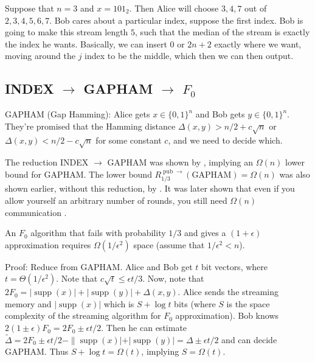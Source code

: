 \documentclass[11pt]{article}
\newcommand{\on}{\operatorname}
\begin{document}
\smallskip

Suppose that $n = 3$ and $x = 101_2$. Then Alice will choose $3, 4, 7$ out of $2, 3, 4, 5, 6, 7$. Bob cares about a particular index, suppose the first index. Bob is going to make this stream length $5$, such that the median of the stream is exactly the index he wants. Basically, we can insert 0 or $2n + 2$ exactly where we want, moving around the $j$ index to be the middle, which then we can then output.

\subsection{INDEX $\to$ GAPHAM $\to$ $F_0$}

GAPHAM (Gap Hamming): Alice gets $x \in \{0, 1\}^n$ and Bob gets $y \in \{0, 1\}^n$. They're promised that the Hamming distance $\Delta(x, y) > n/2 + c\sqrt{n}$ or $\Delta(x, y) < n/2 - c\sqrt{n}$ for some constant $c$, and we need to decide which.

\smallskip

The reduction INDEX $\to$ GAPHAM was shown by \cite{jayram2008one}, implying an $\Omega(n)$ lower bound for GAPHAM. The lower bound $R^{\on{pub}\rightarrow}_{1/3}(\mathrm{GAPHAM}) = \Omega(n)$ was also shown earlier, without this reduction, by \cite{IndykW03,Woodruff04}. It was later shown that even if you allow yourself an arbitrary number of rounds, you still need $\Omega(n)$ communication \cite{ChakrabartiR12}. 

\smallskip

An $F_0$ algorithm that fails with probability $1/3$ and gives a $(1 + \epsilon)$ approximation requires $\Omega(1/\epsilon^2)$ space (assume that $1/\epsilon^2 < n$).

Proof: Reduce from GAPHAM. Alice and Bob get $t$ bit vectors, where $t = \Theta(1/\epsilon^2)$. Note that $c\sqrt{t}\le \epsilon t/3$. Now, note that $2F_0 = |\on{supp}(x)| + |\on{supp}(y)| + \Delta(x, y)$. Alice sends the streaming memory and $|\on{supp}(x)|$ which is $S + \log t$ bits (where $S$ is the space complexity of the streaming algorithm for $F_0$ approximation). Bob knows $2(1 \pm \epsilon)F_0 = 2F_0 \pm \epsilon t/2$. Then he can estimate $\tilde{\Delta} = 2F_0 \pm \epsilon t/2 - \|\on{supp}(x)| + |\on{supp}(y)|= \Delta \pm \epsilon t/2$ and can decide GAPHAM. Thus $S + \log t = \Omega(t)$, implying $S = \Omega(t)$.



\end{document}
